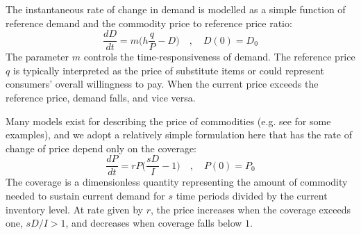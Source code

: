 \documentclass[12pt]{article}
\begin{document}
The instantaneous rate of change in demand is modelled as a simple function of reference demand and the commodity price to reference price ratio:
%
\begin{equation}
  \frac{dD}{dt} = m \Big( h \frac{q}{P} - D\Big) \quad, \quad D(0) = D_0
  \label{eq_demand}
\end{equation}
%
The parameter $m$ controls the time-responsiveness of demand. The reference price $q$ is typically interpreted as the price of substitute items \cite{sterman2000} or could represent consumers' overall willingness to pay. When the current price exceeds the reference price, demand falls, and vice versa.

Many models exist for describing the price of commodities (e.g. see \cite{legrand2019,deGoede2013} for some examples), and we adopt a relatively simple formulation here that has the rate of change of price depend only on the coverage:
%
\begin{equation}
  \frac{dP}{dt} = r P \Big(\frac{sD}{I} - 1\Big) \quad, \quad P(0) = P_0
  \label{eq_price}
\end{equation}
%
The coverage is a dimensionless quantity representing the amount of commodity needed to sustain current demand for $s$ time periods divided by the current inventory level. At rate given by $r$, the price increases when the coverage exceeds one, $sD/I > 1$, and decreases when coverage falls below $1$.
\end{document}

